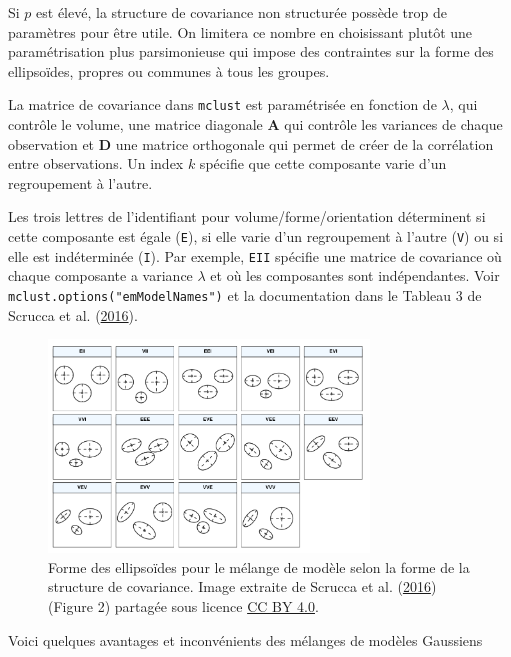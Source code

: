 \documentclass[
  11pt,
  letterpaper,
]{scrbook}
\theoremstyle{definition}
\theoremstyle{remark}
\begin{document}
Si \(p\) est élevé, la structure de covariance non structurée possède
trop de paramètres pour être utile. On limitera ce nombre en choisissant
plutôt une paramétrisation plus parsimonieuse qui impose des contraintes
sur la forme des ellipsoïdes, propres ou communes à tous les groupes.

La matrice de covariance dans \texttt{mclust} est paramétrisée en
fonction de \(\lambda\), qui contrôle le volume, une matrice diagonale
\(\mathbf{A}\) qui contrôle les variances de chaque observation et
\(\mathbf{D}\) une matrice orthogonale qui permet de créer de la
corrélation entre observations. Un index \(k\) spécifie que cette
composante varie d'un regroupement à l'autre.

Les trois lettres de l'identifiant pour volume/forme/orientation
déterminent si cette composante est égale (\texttt{E}), si elle varie
d'un regroupement à l'autre (\texttt{V}) ou si elle est indéterminée
(\texttt{I}). Par exemple, \texttt{EII} spécifie une matrice de
covariance où chaque composante a variance \(\lambda\) et où les
composantes sont indépendantes. Voir
\texttt{mclust.options("emModelNames")} et la documentation dans le
Tableau 3 de Scrucca et al. (\protect\hyperlink{ref-mclust5}{2016}).

\begin{figure}[ht!]

{\centering \includegraphics[width=3.35in,height=\textheight]{figures/mclust5-parametrization.png}

}

\caption{\label{fig-modeles}Forme des ellipsoïdes pour le mélange de
modèle selon la forme de la structure de covariance. Image extraite de
Scrucca et al. (\protect\hyperlink{ref-mclust5}{2016}) (Figure 2)
partagée sous licence
\href{https://creativecommons.org/licenses/by/4.0/}{CC BY 4.0}.}

\end{figure}

Voici quelques avantages et inconvénients des mélanges de modèles
Gaussiens
\end{document}
